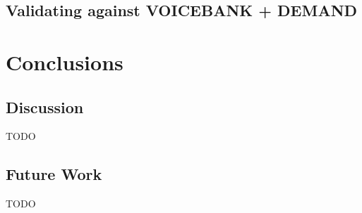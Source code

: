 \documentclass[logo,bsc,singlespacing,parskip,online]{infthesis}
\begin{document}
\section{Validating against VOICEBANK + DEMAND}

\chapter{Conclusions}
\section{Discussion}
TODO
\section{Future Work}
TODO















\end{document}
